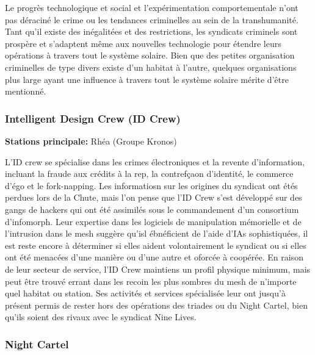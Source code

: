                                              Le progrès technologique et social et l'expérimentation comportementale n'ont pas déraciné le crime ou les tendances criminelles au sein de la transhumanité. Tant qu'il existe des inégalitées et des restrictions, les syndicats criminels sont prospère et s'adaptent même aux nouvelles technologie pour étendre leurs opérations à travers tout le système solaire. Bien que des petites organisation criminelles de type divers existe d'un habitat à l'autre, quelques organisations plus large ayant une influence à travers tout le système solaire mérite d'être mentionné. 

                                             \subsubsection{Intelligent Design Crew (ID Crew)} \label{sec:intell-design-crew} 

                                             \textbf{Stations principale:} Rhéa (Groupe Kronos) 

                                             L'ID crew se spécialise dans les crimes électroniques et la revente d'information, incluant la fraude aux crédits à la rep, la contrefçaon d'identité, le commerce d'égo et le fork-napping. Les informatiosn sur les origines du syndicat ont étés perdues lors de la Chute, mais l'on pense que l'ID Crew s'est développé sur des gangs de hackers qui ont été assimilés sous le commandement d'un consortium d'infomorph. Leur expertise dans les logiciels de manipulation mémorielle et de l'intrusion dans le mesh suggère qu'isl ébnéficient de l'aide d'IAs sophistiquées, il est reste encore à déterminer si elles aident volontairement le syndicat ou si elles ont été menacées d'une manière ou d'une autre et oforcée à coopérée. En raison de leur secteur de service, l'ID Crew maintiens un profil physique minimum, mais peut être trouvé errant dans les recoin les plus sombres du mesh de n'importe quel habitat ou station. Ses activités et services spécialisée leur ont jusqu'à présent permis de rester hors des opérations des triades ou du Night Cartel, bien qu'ils soient des rivaux avec le syndicat Nine Lives. 

                                             \subsubsection{Night Cartel} \label{sec:night-cartel} 

